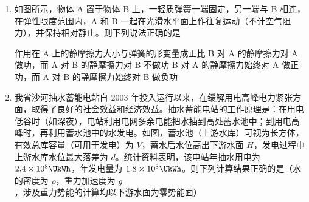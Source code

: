 \documentclass[\gkver]{gaokaozhenti}
\begin{document}
\begin{enumerate}

{保持 P 的位置及 $U_{1}$ 不变，S 由 a 切换到 b，则 $I_{2}$ 减小}
{保持 P 的位置及 $U_{1}$ 不变，S 由 b 切换到 a，则 $I_{1}$ 增大}
{保持 $U_{1}$ 不变，S 接在 b 端，将 P 向上滑动，则 $I_{1}$ 减小}


\item
如图所示，物体 A 置于物体 B 上，一轻质弹簧一端固定，另一端与 B 相连，在弹性限度范围内，A 和 B 一起在光滑水平面上作往复运动（不计空气阻力），并保持相对静止。则下列说法正确的是


{作用在 A 上的静摩擦力大小与弹簧的形变量成正比}
{B 对 A 的静摩擦力对 A 做功，而 A 对 B 的静摩擦力对 B 不做功}
{B 对 A 的静摩擦力始终对 A 做正功，而 A 对 B 的静摩擦力始终对 B 做负功}


\item
我省沙河抽水蓄能电站自 2003 年投入运行以来，在缓解用电高峰电力紧张方面，取得了良好的社会效益和经济效益。抽水蓄能电站的工作原理是：在用电低谷时（如深夜），电站利用电网多余电能把水抽到高处蓄水池中；到用电高峰时，再利用蓄水池中的水发电。如图，蓄水池（上游水库）可视为长方体，有效总库容量（可用于发电）为 $V$，蓄水后水位高出下游水面 $H$，发电过程中上游水库水位最大落差为 $d$。统计资料表明，该电站年抽水用电为 $2.4\times10^{8}\UkWh$，年发电量为 $1.8\times10^{8}\UkWh$。则下列计算结果正确的是（水的密度为 $\rho$，重力加速度为 $g$，涉及重力势能的计算均以下游水面为零势能面）


\end{enumerate}
\end{document}
